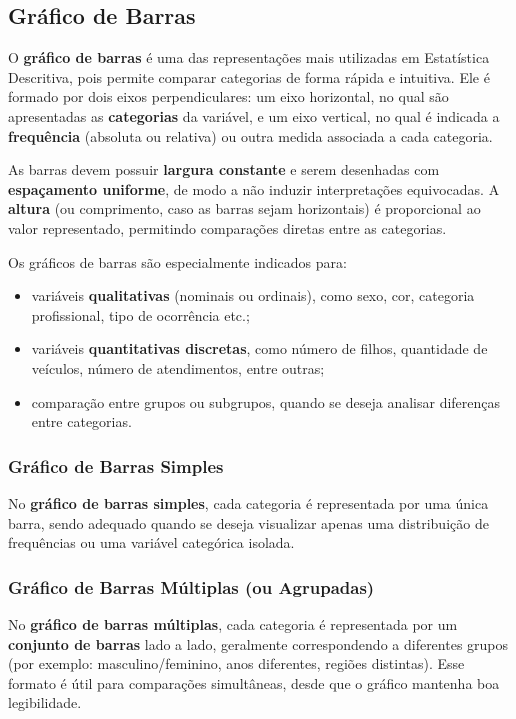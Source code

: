 \subsection{Gráfico de Barras}

O \textbf{gráfico de barras} é uma das representações mais utilizadas em
Estatística Descritiva, pois permite comparar categorias de forma rápida e
intuitiva. Ele é formado por dois eixos perpendiculares: um eixo horizontal,
no qual são apresentadas as \textbf{categorias} da variável, e um eixo vertical,
no qual é indicada a \textbf{frequência} (absoluta ou relativa) ou outra medida
associada a cada categoria. \vskip0.3cm

As barras devem possuir \textbf{largura constante} e serem desenhadas com
\textbf{espaçamento uniforme}, de modo a não induzir interpretações equivocadas.
A \textbf{altura} (ou comprimento, caso as barras sejam horizontais) é
proporcional ao valor representado, permitindo comparações diretas entre as
categorias. \vskip0.3cm

Os gráficos de barras são especialmente indicados para:

\begin{itemize}
    \item variáveis \textbf{qualitativas} (nominais ou ordinais), como sexo,
    cor, categoria profissional, tipo de ocorrência etc.;
    \item variáveis \textbf{quantitativas discretas}, como número de filhos,
    quantidade de veículos, número de atendimentos, entre outras;
    \item comparação entre grupos ou subgrupos, quando se deseja analisar
    diferenças entre categorias.
\end{itemize}
\vskip0.3cm

\subsubsection{Gráfico de Barras Simples}

No \textbf{gráfico de barras simples}, cada categoria é representada por uma
única barra, sendo adequado quando se deseja visualizar apenas uma distribuição
de frequências ou uma variável categórica isolada. \vskip0.3cm

\subsubsection{Gráfico de Barras Múltiplas (ou Agrupadas)}

No \textbf{gráfico de barras múltiplas}, cada categoria é representada por um
\textbf{conjunto de barras} lado a lado, geralmente correspondendo a diferentes
grupos (por exemplo: masculino/feminino, anos diferentes, regiões distintas).
Esse formato é útil para comparações simultâneas, desde que o gráfico mantenha
boa legibilidade. \vskip0.3cm


